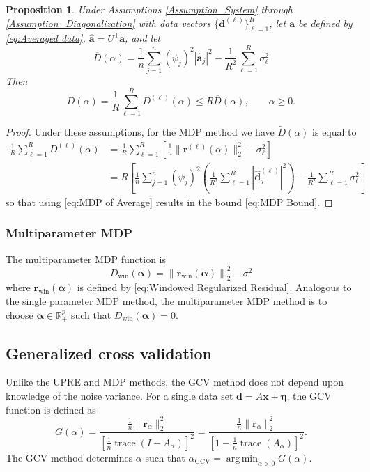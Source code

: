 \documentclass[12pt]{article}
\newcommand{\aVec}{\mathbf{a}}	%
\newcommand{\dVec}{\mathbf{d}}	%
\newcommand{\rVec}{\mathbf{r}}	%
\newcommand{\xVec}{\mathbf{x}}	%
\newcommand{\trans}[1]{{#1}^\mathsf{T}}	%
\DeclareMathOperator{\trace}{trace}		%
\newcommand{\dft}[1]{\widehat{#1}}	%
\newcommand{\regparam}{\alpha}  %
\newcommand{\regparamVec}{\bm{\regparam}}   %
\DeclareMathOperator*{\argmin}{arg\,min}
\newcommand{\mfilt}{\psi}
\newcommand{\noise}{\eta}	%
\newcommand{\noiseSD}{\sigma}	%
\newcommand{\noiseVec}{\bm{\noise}}	%
\newcommand{\regres}{\mathbf{r}_{\regparam}}	%
\newcommand{\A}{A_{\regparam}}	%
\newcommand{\G}{G}	%
\newcommand{\GCV}{\text{GCV}}	%
\newcommand{\D}{D}	%
\newcommand{\Dwin}{\D_{\text{win}}}	%
\newtheorem{proposition}{Proposition}[section]
\begin{document}
\begin{proposition}
Under Assumptions \ref{Assumption_System} through \ref{Assumption_Diagonalization} with data vectors $\{\dVec^{(\ell)}\}_{\ell=1}^R$, let $\aVec$ be defined by \eqref{eq:Averaged data}, $\dft{\aVec} = \trans{U}\aVec$, and let
\begin{equation}
\label{eq:MDP of Average}
\overline{\D}(\regparam) = \frac{1}{n}\sum_{j=1}^{n} \left(\mfilt_j\right)^2 |\dft{\aVec}_j|^2 - \frac{1}{R^2}\sum_{\ell=1}^R \noiseSD_{\ell}^2
\end{equation}
Then
\begin{equation}
\label{eq:MDP Bound}
\widetilde{\D}(\regparam) = \frac{1}{R} \sum_{\ell=1}^R \D^{(\ell)}(\regparam) \leq R \overline{\D}(\regparam), \qquad \regparam \geq 0.
\end{equation}
\end{proposition}
\begin{proof}
Under these assumptions, for the MDP method we have $\widetilde{\D}(\regparam)$ is equal to
\begin{align*}
    \frac{1}{R} \sum_{\ell=1}^R \D^{(\ell)}(\regparam) &= \frac{1}{R}\sum_{\ell=1}^R \left[\frac{1}{n}\|\rVec^{(\ell)}(\regparam)\|_2^2 - \noiseSD_{\ell}^2\right] \\
    &= R\left[\frac{1}{n}\sum_{j=1}^{n} \left(\mfilt_j\right)^2\left(\frac{1}{R^2} \sum_{\ell=1}^R |\dft{\dVec}_j^{(\ell)}|^2\right) - \frac{1}{R^2}\sum_{\ell=1}^R \noiseSD_{\ell}^2\right]
\end{align*}
so that using \eqref{eq:MDP of Average} results in the bound \eqref{eq:MDP Bound}.
\end{proof}

\subsubsection{Multiparameter MDP} \label{sec:Multiparameter MDP}
The multiparameter MDP function is
\begin{equation}
\label{eq:Windowed MDP}
    \Dwin(\regparamVec) = \left\|\rVec_\text{win}(\regparamVec)\right\|_2^2 - \noiseSD^2
\end{equation}
where $\rVec_\text{win}(\regparamVec)$ is defined by \eqref{eq:Windowed Regularized Residual}. Analogous to the single parameter MDP method, the multiparameter MDP method is to choose $\regparamVec \in \mathbb{R}_+^p$ such that $\Dwin(\regparamVec) = 0$.

\subsection{Generalized cross validation} \label{sec:GCV}
Unlike the UPRE and MDP methods, the GCV method does not depend upon knowledge of the noise variance. For a single data set $\dVec = A\xVec + \noiseVec$, the GCV function is defined as
\begin{equation}
\label{eq:GCV}
\G(\regparam) = \frac{\frac{1}{n}\|\regres\|_2^2}{\left[\frac{1}{n}\trace(I-\A)\right]^2} = \frac{\frac{1}{n}\|\regres\|_2^2}{\left[1 - \frac{1}{n}\trace(\A)\right]^2}.
\end{equation}
The GCV method determines $\regparam$ such that $\regparam_\GCV = \argmin_{\regparam > 0} \G(\regparam)$.
\end{document}
